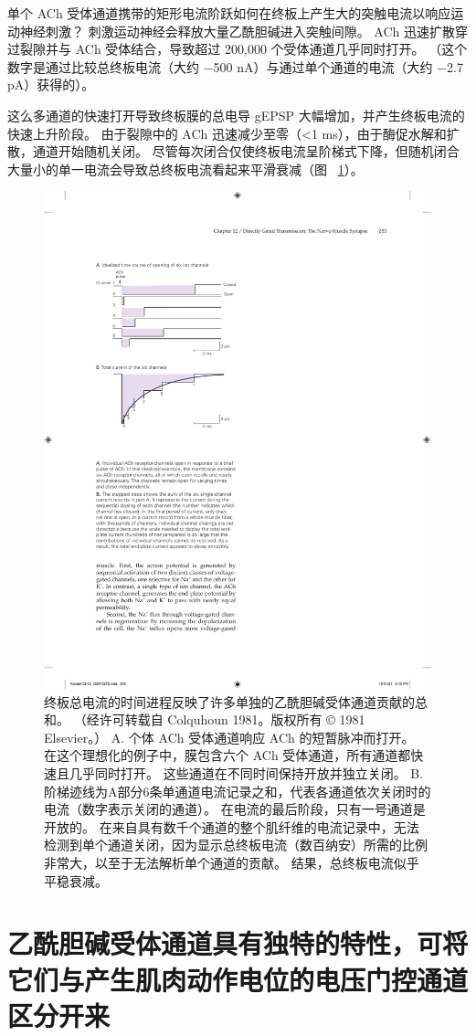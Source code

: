 单个 ACh 受体通道携带的矩形电流阶跃如何在终板上产生大的突触电流以响应运动神经刺激？
刺激运动神经会释放大量乙酰胆碱进入突触间隙。
ACh 迅速扩散穿过裂隙并与 ACh 受体结合，导致超过 200,000 个受体通道几乎同时打开。
（这个数字是通过比较总终板电流（大约 −500 nA）与通过单个通道的电流（大约 −2.7 pA）获得的）。


这么多通道的快速打开导致终板膜的总电导 gEPSP 大幅增加，并产生终板电流的快速上升阶段。
由于裂隙中的 ACh 迅速减少至零（<1 ms），由于酶促水解和扩散，通道开始随机关闭。
尽管每次闭合仅使终板电流呈阶梯式下降，但随机闭合大量小的单一电流会导致总终板电流看起来平滑衰减（图 ~\ref{fig:12_8}）。


\begin{figure}[htbp]
	\centering
	\includegraphics[width=0.5\linewidth]{chap12/fig_12_8}
	\caption{终板总电流的时间进程反映了许多单独的乙酰胆碱受体通道贡献的总和。 （经许可转载自 Colquhoun 1981。版权所有 © 1981 Elsevier。） A. 个体 ACh 受体通道响应 ACh 的短暂脉冲而打开。 在这个理想化的例子中，膜包含六个 ACh 受体通道，所有通道都快速且几乎同时打开。 这些通道在不同时间保持开放并独立关闭。 B.阶梯迹线为A部分6条单通道电流记录之和，代表各通道依次关闭时的电流（数字表示关闭的通道）。 在电流的最后阶段，只有一号通道是开放的。 在来自具有数千个通道的整个肌纤维的电流记录中，无法检测到单个通道关闭，因为显示总终板电流（数百纳安）所需的比例非常大，以至于无法解析单个通道的贡献。 结果，总终板电流似乎平稳衰减。}
	\label{fig:12_8}
\end{figure}



\section{乙酰胆碱受体通道具有独特的特性，可将它们与产生肌肉动作电位的电压门控通道区分开来}

